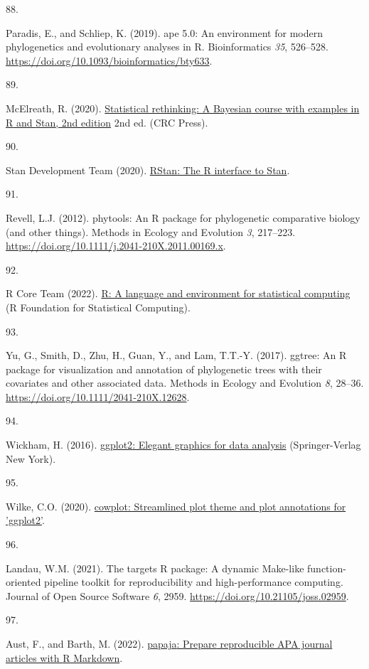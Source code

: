 \documentclass[
  man, donotrepeattitle,floatsintext]{apa6}
\newlength{\cslhangindent}
\newlength{\csllabelwidth}
\newlength{\cslentryspacingunit} %
\newenvironment{CSLReferences}[2] %
 {%
  \setlength{\parindent}{0pt}
  \ifodd #1
  \let\oldpar\par
  \def\par{\hangindent=\cslhangindent\oldpar}
  \fi
  \setlength{\parskip}{#2\cslentryspacingunit}
 }%
 {}
\newcommand{\CSLLeftMargin}[1]{\parbox[t]{\csllabelwidth}{#1}}
\newcommand{\CSLRightInline}[1]{\parbox[t]{\linewidth - \csllabelwidth}{#1}\break}
\begin{document}
\begin{CSLReferences}{0}{0}
\leavevmode{}%
\CSLLeftMargin{88. }%
\CSLRightInline{Paradis, E., and Schliep, K. (2019). {ape} 5.0: An environment for modern phylogenetics and evolutionary analyses in {R}. Bioinformatics \emph{35}, 526--528. \url{https://doi.org/10.1093/bioinformatics/bty633}.}

\leavevmode{}%
\CSLLeftMargin{89. }%
\CSLRightInline{McElreath, R. (2020). \href{http://xcelab.net/rm/statistical-rethinking/}{Statistical rethinking: A {Bayesian} course with examples in {R} and {Stan}, 2nd edition} 2nd ed. (CRC Press).}

\leavevmode{}%
\CSLLeftMargin{90. }%
\CSLRightInline{Stan Development Team (2020). \href{http://mc-stan.org/}{{RStan}: The {R} interface to {Stan}}.}

\leavevmode{}%
\CSLLeftMargin{91. }%
\CSLRightInline{Revell, L.J. (2012). {phytools}: An {R} package for phylogenetic comparative biology (and other things). Methods in Ecology and Evolution \emph{3}, 217--223. \url{https://doi.org/10.1111/j.2041-210X.2011.00169.x}.}

\leavevmode{}%
\CSLLeftMargin{92. }%
\CSLRightInline{R Core Team (2022). \href{https://www.R-project.org/}{R: A language and environment for statistical computing} (R Foundation for Statistical Computing).}

\leavevmode{}%
\CSLLeftMargin{93. }%
\CSLRightInline{Yu, G., Smith, D., Zhu, H., Guan, Y., and Lam, T.T.-Y. (2017). {ggtree}: An {R} package for visualization and annotation of phylogenetic trees with their covariates and other associated data. Methods in Ecology and Evolution \emph{8}, 28--36. \url{https://doi.org/10.1111/2041-210X.12628}.}

\leavevmode{}%
\CSLLeftMargin{94. }%
\CSLRightInline{Wickham, H. (2016). \href{https://ggplot2.tidyverse.org}{{ggplot2}: Elegant graphics for data analysis} (Springer-Verlag New York).}

\leavevmode{}%
\CSLLeftMargin{95. }%
\CSLRightInline{Wilke, C.O. (2020). \href{https://CRAN.R-project.org/package=cowplot}{{cowplot}: Streamlined plot theme and plot annotations for 'ggplot2'}.}

\leavevmode{}%
\CSLLeftMargin{96. }%
\CSLRightInline{Landau, W.M. (2021). The targets {R} package: A dynamic {M}ake-like function-oriented pipeline toolkit for reproducibility and high-performance computing. Journal of Open Source Software \emph{6}, 2959. \url{https://doi.org/10.21105/joss.02959}.}

\leavevmode{}%
\CSLLeftMargin{97. }%
\CSLRightInline{Aust, F., and Barth, M. (2022). \href{https://github.com/crsh/papaja}{{papaja}: {Prepare} reproducible {APA} journal articles with {R Markdown}}.}

\end{CSLReferences}
\end{document}
